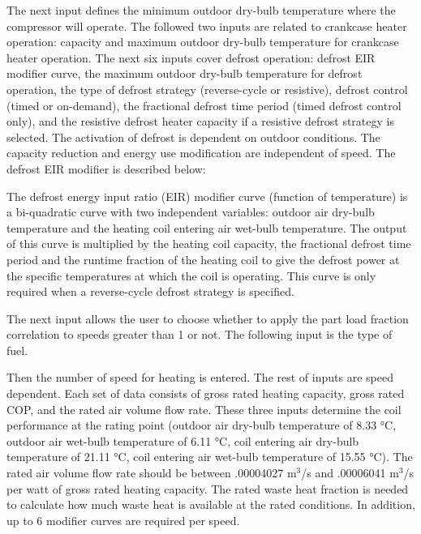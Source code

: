 The next input defines the minimum outdoor dry-bulb temperature where the compressor will operate. The followed two inputs are related to crankcase heater operation: capacity and maximum outdoor dry-bulb temperature for crankcase heater operation. The next six inputs cover defrost operation: defrost EIR modifier curve, the maximum outdoor dry-bulb temperature for defrost operation, the type of defrost strategy (reverse-cycle or resistive), defrost control (timed or on-demand), the fractional defrost time period (timed defrost control only), and the resistive defrost heater capacity if a resistive defrost strategy is selected. The activation of defrost is dependent on outdoor conditions. The capacity reduction and energy use modification are independent of speed. The defrost EIR modifier is described below:

The defrost energy input ratio (EIR) modifier curve (function of temperature) is a bi-quadratic curve with two independent variables: outdoor air dry-bulb temperature and the heating coil entering air wet-bulb temperature. The output of this curve is multiplied by the heating coil capacity, the fractional defrost time period and the runtime fraction of the heating coil to give the defrost power at the specific temperatures at which the coil is operating. This curve is only required when a reverse-cycle defrost strategy is specified.

The next input allows the user to choose whether to apply the part load fraction correlation to speeds greater than 1 or not. The following input is the type of fuel.

Then the number of speed for heating is entered. The rest of inputs are speed dependent. Each set of data consists of gross rated heating capacity, gross rated COP, and the rated air volume flow rate. These three inputs determine the coil performance at the rating point (outdoor air dry-bulb temperature of 8.33 °C, outdoor air wet-bulb temperature of 6.11 °C, coil entering air dry-bulb temperature of 21.11 °C, coil entering air wet-bulb temperature of 15.55 °C). The rated air volume flow rate should be between .00004027 m\(^{3}\)/s and .00006041 m\(^{3}\)/s per watt of gross rated heating capacity. The rated waste heat fraction is needed to calculate how much waste heat is available at the rated conditions. In addition, up to 6 modifier curves are required per speed.

